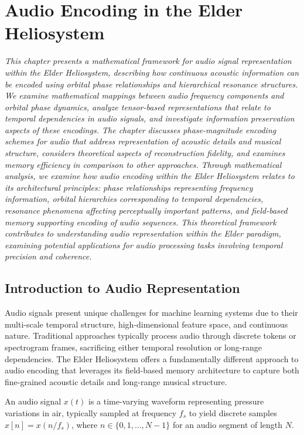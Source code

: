 \chapter{Audio Encoding in the Elder Heliosystem}

\textit{This chapter presents a mathematical framework for audio signal representation within the Elder Heliosystem, describing how continuous acoustic information can be encoded using orbital phase relationships and hierarchical resonance structures. We examine mathematical mappings between audio frequency components and orbital phase dynamics, analyze tensor-based representations that relate to temporal dependencies in audio signals, and investigate information preservation aspects of these encodings. The chapter discusses phase-magnitude encoding schemes for audio that address representation of acoustic details and musical structure, considers theoretical aspects of reconstruction fidelity, and examines memory efficiency in comparison to other approaches. Through mathematical analysis, we examine how audio encoding within the Elder Heliosystem relates to its architectural principles: phase relationships representing frequency information, orbital hierarchies corresponding to temporal dependencies, resonance phenomena affecting perceptually important patterns, and field-based memory supporting encoding of audio sequences. This theoretical framework contributes to understanding audio representation within the Elder paradigm, examining potential applications for audio processing tasks involving temporal precision and coherence.}

\section{Introduction to Audio Representation}

Audio signals present unique challenges for machine learning systems due to their multi-scale temporal structure, high-dimensional feature space, and continuous nature. Traditional approaches typically process audio through discrete tokens or spectrogram frames, sacrificing either temporal resolution or long-range dependencies. The Elder Heliosystem offers a fundamentally different approach to audio encoding that leverages its field-based memory architecture to capture both fine-grained acoustic details and long-range musical structure.

\begin{definition}
An audio signal $x(t)$ is a time-varying waveform representing pressure variations in air, typically sampled at frequency $f_s$ to yield discrete samples $x[n] = x(n/f_s)$, where $n \in \{0,1,\ldots,N-1\}$ for an audio segment of length $N$.
\end{definition}

